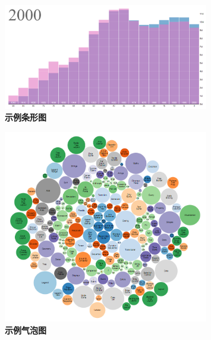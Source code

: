 \begin{figure}[htbp]
    \centering
    \includegraphics[width=0.8\textwidth]{figure/D3/example_population_pyramid.png}
    \caption{\textbf{示例条形图}}
    \label{fig:example_population_pyramid}
\end{figure}

\begin{figure}[htbp]
    \centering
    \includegraphics[width=0.8\textwidth]{figure/D3/example_bubble_chart.png}
    \caption{\textbf{示例气泡图}}
    \label{fig:example_bubble_chart}
\end{figure}

